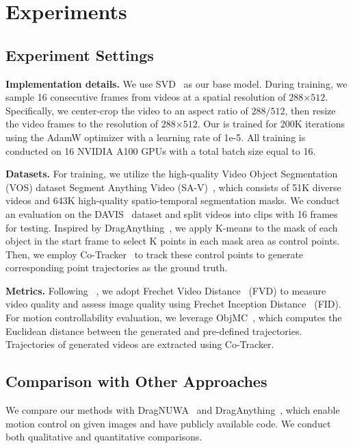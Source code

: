 \section{Experiments}
\label{sec:exp}


\subsection{Experiment Settings}

\noindent \textbf{Implementation details.}
We use SVD~\cite{SVD} as our base model. During training, we sample 16 consecutive frames from videos at a spatial resolution of $288$×$512$. Specifically, we center-crop the video to an aspect ratio of $288/512$, then resize the video frames to the resolution of $288$×$512$.
Our \method is trained for 200K iterations using the AdamW optimizer with a learning rate of 1e-5. All training is conducted on 16 NVIDIA A100 GPUs with a total batch size equal to 16.

\noindent \textbf{Datasets.}
For training, we utilize the high-quality Video Object Segmentation (VOS) dataset Segment Anything Video (SA-V)~\cite{SAM2}, which consists of 51K diverse videos and 643K high-quality spatio-temporal segmentation masks. We conduct an evaluation on the DAVIS~\cite{davis} dataset and split videos into clips with 16 frames for testing. Inspired by DragAnything~\cite{DragAnything}, we apply K-means to the mask of each object in the start frame to select K points in each mask area as control points. Then, we employ Co-Tracker~\cite{co-tracker} to track these control points to generate corresponding point trajectories as the ground truth.

\noindent \textbf{Metrics.}
Following ~\cite{DragAnything, Motionctrl}, we adopt Frechet Video Distance~\cite{FVD} (FVD) to measure video quality and assess image quality using Frechet Inception Distance~\cite{FID} (FID). For motion controllability evaluation,
we leverage ObjMC~\cite{Motionctrl}, which computes the Euclidean distance between the generated and pre-defined trajectories. Trajectories of generated videos are extracted using Co-Tracker.

\subsection{Comparison with Other Approaches}

We compare our methods with DragNUWA~\cite{DragNUWA} and DragAnything~\cite{DragAnything}, which enable motion control on given images and have publicly available code. We conduct both qualitative and quantitative comparisons.

